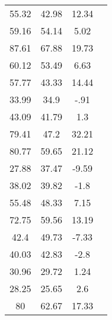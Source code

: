 \begin{longtable}{cccc}
55.32&42.98&12.34\\
59.16&54.14&5.02\\
87.61&67.88&19.73\\
60.12&53.49&6.63\\
57.77&43.33&14.44\\
33.99&34.9&-.91\\
43.09&41.79&1.3\\
79.41&47.2&32.21\\
80.77&59.65&21.12\\
27.88&37.47&-9.59\\
38.02&39.82&-1.8\\
55.48&48.33&7.15\\
72.75&59.56&13.19\\
42.4&49.73&-7.33\\
40.03&42.83&-2.8\\
30.96&29.72&1.24\\
28.25&25.65&2.6\\
80&62.67&17.33\\
\hline
\end{longtable}


